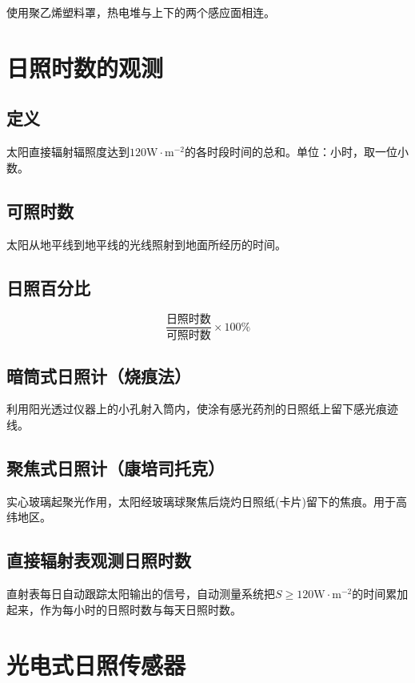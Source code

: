 \documentclass[UTF8,11pt]{ctexbook}
\begin{document}
使用聚乙烯塑料罩，热电堆与上下的两个感应面相连。

\section{日照时数的观测}

\subsection{定义}

太阳直接辐射辐照度达到\(120\mathrm{W\cdot m^{-2}}\)的各时段时间的总和。单位：小时，取一位小数。

\subsection{可照时数}

太阳从地平线到地平线的光线照射到地面所经历的时间。

\subsection{日照百分比}
\[
\frac{\text{日照时数}}{\text{可照时数}}\times100\%
\]

\subsection{暗筒式日照计（烧痕法）}

利用阳光透过仪器上的小孔射入筒内，使涂有感光药剂的日照纸上留下感光痕迹线。

\subsection{聚焦式日照计（康培司托克）}

实心玻璃起聚光作用，太阳经玻璃球聚焦后烧灼日照纸(卡片)留下的焦痕。用于高纬地区。

\subsection{直接辐射表观测日照时数}

直射表每日自动跟踪太阳输出的信号，自动测量系统把\(S\ge120\mathrm{W\cdot m^{-2}}\)的时间累加起来，作为每小时的日照时数与每天日照时数。

\section{光电式日照传感器}
\end{document}
